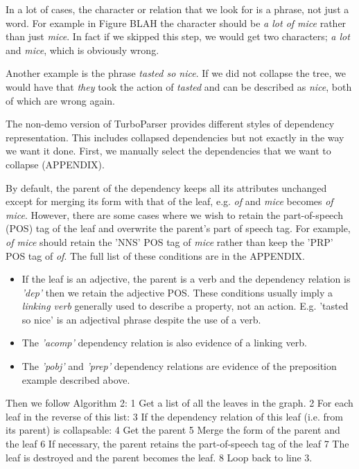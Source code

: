 In a lot of cases, the character or relation that we look for is a phrase, not just a word. For example in Figure BLAH the character should be \textit{a lot of mice} rather than just \textit{mice}. In fact if we skipped this step, we would get two characters; \textit{a lot} and \textit{mice}, which is obviously wrong.

Another example is the phrase \textit{tasted so nice}. If we did not collapse the tree, we would have that \textit{they} took the action of \textit{tasted} and can be described as \textit{nice}, both of which are wrong again.

The non-demo version of TurboParser provides different styles of dependency representation. This includes collapsed dependencies but not exactly in the way we want it done. First, we manually select the dependencies that we want to collapse (APPENDIX).

By default, the parent of the dependency keeps all its attributes unchanged except for merging its form with that of the leaf, e.g. \textit{of} and \textit{mice} becomes \textit{of mice}. However, there are some cases where we wish to retain the part-of-speech (POS) tag of the leaf and overwrite the parent's part of speech tag. For example, \textit{of mice} should retain the 'NNS' POS tag of \textit{mice} rather than keep the 'PRP' POS tag of \textit{of}. The full list of these conditions are in the APPENDIX.

\begin{itemize}
\item{If the leaf is an adjective, the parent is a verb and the dependency relation is \textit{'dep'} then we retain the adjective POS. These conditions usually imply a \textit{linking verb} generally used to describe a property, not an action. E.g. 'tasted so nice' is an adjectival phrase despite the use of a verb.}
\item{The \textit{'acomp'} dependency relation is also evidence of a linking verb.}
\item{The \textit{'pobj'} and \textit{'prep'} dependency relations are evidence of the preposition example described above. }
\end{itemize}

Then we follow Algorithm 2:
1 Get a list of all the leaves in the graph.
2 For each leaf in the reverse of this list:
3	If the dependency relation of this leaf (i.e. from its parent) is collapsable:
4		Get the parent
5		Merge the form of the parent and the leaf
6		If necessary, the parent retains the part-of-speech tag of the leaf
7		The leaf is destroyed and the parent becomes the leaf.
8		Loop back to line 3.

